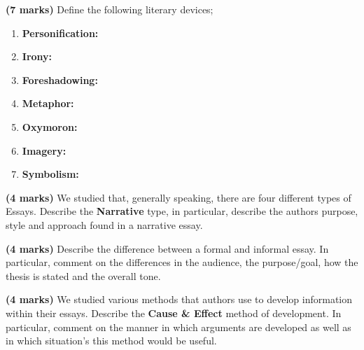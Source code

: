 \documentclass[12pt]{article} %
\begin{document}
\begin{qstn}
    \textbf{(7 marks)} Define the following literary devices;
    \begin{enumerate}[label=(\alph*)]
      \item \textbf{Personification:}
            \vspace*{1cm}
      \item \textbf{Irony:}
            \vspace*{1cm}
      \item \textbf{Foreshadowing:}
            \vspace*{1cm}
      \item \textbf{Metaphor:}
            \vspace*{1cm}
      \item \textbf{Oxymoron:}
            \vspace*{1cm}

      \item \textbf{Imagery:}
            \vspace*{1cm}

      \item \textbf{Symbolism:}
            \vspace*{1cm}
    \end{enumerate}
\end{qstn}


\begin{qstn}
  \textbf{(4 marks)} We studied that, generally speaking,  there are four different types of Essays. Describe the \textbf{Narrative} type, in
  particular, describe the authors purpose, style and approach found in a narrative essay.
  \newpage

\end{qstn}


\begin{qstn}
  \textbf{(4 marks)} Describe the difference between a formal and informal essay. In particular, comment on the differences in the audience, the purpose/goal, how the thesis is stated and the overall tone.
\end{qstn}

\vspace*{9cm}

\begin{qstn}
  \textbf{(4 marks)} We studied various methods that authors use to develop information within their essays. Describe the \textbf{Cause \& Effect} method of development. In particular, comment on the manner in which arguments are developed as well as in which situation's this method would
  be useful.
\end{qstn}
\end{document}
